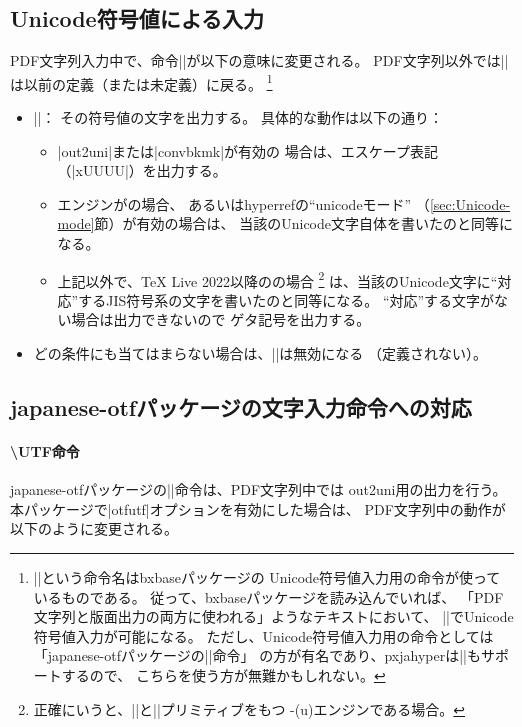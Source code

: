 \documentclass[uplatex,dvipdfmx,a4paper]{jsarticle}
\newcommand{\Pkg}[1]{\textsf{#1}}
\newcommand{\Meta}[1]{$\langle$\mbox{}#1\mbox{}$\rangle$}
\newcommand{\Means}{：\quad}
\newcommand{\／}{\mbox{}／\mbox{}}
\begin{document}
\subsection{Unicode符号値による入力}
\label{ssec:ux-command}

PDF文字列入力中で、命令|\Ux|が以下の意味に変更される。
PDF文字列以外では|\Ux|は以前の定義（または未定義）に戻る。
\footnote{|\Ux|という命令名は\Pkg{bxbase}パッケージの
Unicode符号値入力用の命令が使っているものである。
従って、\Pkg{bxbase}パッケージを読み込んでいれば、
「PDF文字列と版面出力の両方に使われる」ようなテキストにおいて、
|\Ux|でUnicode符号値入力が可能になる。
ただし、Unicode符号値入力用の命令としては
「\Pkg{japanese-otf}パッケージの|\UTF|命令」
の方が有名であり、\Pkg{pxjahyper}は|\UTF|もサポートするので、
こちらを使う方が無難かもしれない。}

\begin{itemize}
\item |\Ux{|\Meta{Unicode符号値16進}|}|\Means
  その符号値の文字を出力する。
  具体的な動作は以下の通り：
  \begin{itemize}
  \item |out2uni|または|convbkmk|が有効の
  場合は、エスケープ表記（|\0xUUUU|）を出力する。
  \item エンジンが{\upLaTeX}の場合、
  あるいは\Pkg{hyperref}の“unicodeモード”
  （\ref{sec:Unicode-mode}節）が有効の場合は、
  当該のUnicode文字自体を書いたのと同等になる。
  \item 上記以外で、{\TeX} Live 2022以降の{\pLaTeX}の場合
  \footnote{正確にいうと、|\Uchar|と|\ucs|プリミティブをもつ
    {\TLe-(u)\pTeX}エンジンである場合。}%
  は、当該のUnicode文字に“対応”するJIS符号系の文字を書いたのと同等になる。
  “対応”する文字がない場合は出力できないので
  ゲタ記号を出力する。
  \end{itemize}
  \item どの条件にも当てはまらない場合は、|\Ux|は無効になる
  （定義されない）。
\end{itemize}

\subsection{\Pkg{japanese-otf}パッケージの文字入力命令への対応}
\label{ssec:otf-package}

\paragraph{\textbackslash UTF命令}
\Pkg{japanese-otf}パッケージの|\UTF|命令は、PDF文字列中では
out2uni用の出力を行う。
本パッケージで|otfutf|オプションを有効にした場合は、
PDF文字列中の動作が以下のように変更される。
\end{document}
